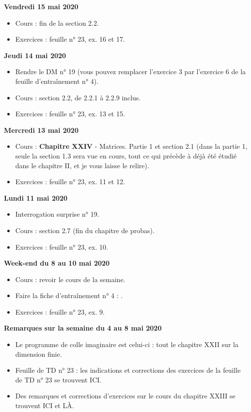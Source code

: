 \documentclass[12pt,a4paper]{article}
\begin{document}
\noindent\textbf{Vendredi 15 mai 2020}
\begin{itemize}
\item Cours : fin de la section 2.2.
\item Exercices : feuille n° 23, ex. 16 et 17.\vspace{.4cm}
\end{itemize}

\noindent\textbf{Jeudi 14 mai 2020}
\begin{itemize}
\item Rendre le DM n° 19 (vous pouvez remplacer l'exercice 3 par l'exercice 6 de la feuille d'entraînement n° 4).
\item Cours : section 2.2, de 2.2.1 à 2.2.9 inclus.
\item Exercices : feuille n° 23, ex. 13 et 15.\vspace{.4cm}
\end{itemize}
 
\noindent\textbf{Mercredi 13 mai 2020}
\begin{itemize}
\item Cours : \textbf{Chapitre XXIV} - Matrices. Partie 1 et section 2.1 (dans la partie 1, seule la section 1.3 sera vue en cours, tout ce qui précède à déjà été étudié dans le chapitre II, et je vous laisse le relire).
\item Exercices : feuille n° 23, ex. 11 et 12.\vspace{.4cm}
\end{itemize}
 
\noindent\textbf{Lundi 11 mai 2020}
\begin{itemize}
\item Interrogation surprise n° 19.
\item Cours : section 2.7 (fin du chapitre de probas).
\item Exercices : feuille n° 23, ex. 10.\vspace{.4cm}
\end{itemize}

\noindent\textbf{Week-end du 8 au 10 mai 2020}
\begin{itemize}
\item Cours : revoir le cours de la semaine.
\item Faire la fiche d'entraînement n° 4 : .
\item Exercices : feuille n° 23, ex. 9.\vspace{.4cm}
\end{itemize}

\noindent\textbf{\bf Remarques sur la semaine du 4 au 8 mai 2020}
\begin{itemize}
\item Le programme de colle imaginaire est celui-ci : tout le chapitre XXII sur la dimension finie.
\item Feuille de TD n° 23 : les indications et corrections des exercices de la feuille de TD n° 23 se trouvent ICI.
\item Des remarques et corrections d'exercices sur le cours du chapitre XXIII se trouvent ICI et LÀ.\vspace{.4cm}
\end{itemize}
 
\end{document}
